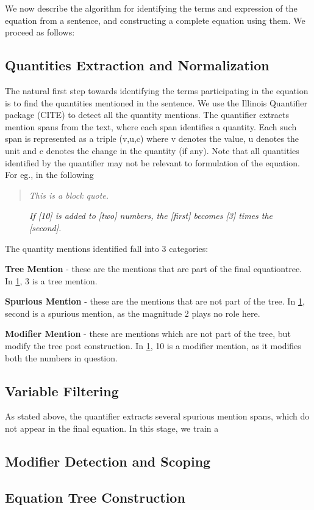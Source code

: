 We now describe the algorithm for identifying the terms and expression of the equation from a sentence, and constructing a complete equation using them. We proceed as follows:
\subsection{Quantities Extraction and Normalization}
The natural first step towards identifying the terms participating in the equation is to find the quantities mentioned in the sentence. We use the Illinois Quantifier package (CITE) to detect all the quantity mentions.
The quantifier extracts mention spans from the text, where each span identifies a quantity. Each such span is represented as a triple (v,u,c) where v denotes the value, u denotes the unit and c denotes the change in the quantity (if any).
Note that all quantities identified by the quantifier may not be relevant to formulation of the equation. For eg., in the following

\begin{quote}
  \emph{This is a block quote.}
\end{quote}

\begin{figure}
  \centering
  \emph{If [10] is added to [two] numbers, the [first] becomes [3] times the [second].}
  \label{fig:mention}
\end{figure}

The quantity mentions identified fall into 3 categories:
\begin{inparaenum}
\item {\bf Tree Mention} - these are the mentions that are part of the final equationtree. In \ref{fig:mention}, 3 is a tree mention.
\item {\bf Spurious Mention} - these are the mentions that are not part of the tree.
In \ref{fig:mention}, second is a spurious mention, as the magnitude 2 plays no role here.
\item {\bf Modifier Mention} - these are mentions which are not part of the tree, but modify the tree post construction. In \ref{fig:mention}, 10 is a modifier mention, as it modifies both the numbers in question. 
\end{inparaenum}

\subsection{Variable Filtering}
As stated above, the quantifier extracts several spurious mention spans, which do not appear in the final equation. In this stage, we train a

\subsection{Modifier Detection and Scoping}
\subsection{Equation Tree Construction}
